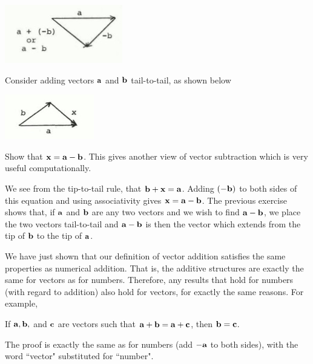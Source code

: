 \documentclass[12pt,letterpaper,reqno]{article}
\numberwithin{equation}{section}
\begin{document}
\begin{center}
	\includegraphics[scale=0.5]{figures_mvc/a_minus_b}
\end{center}

\begin{exercise}
Consider adding vectors ${\bf a}$ and ${\bf b}$ tail-to-tail, as shown below
	\begin{center}
		\includegraphics[scale=0.5]{figures_mvc/b_plus_x_equals_a}
	\end{center}
	Show that ${\bf x}={\bf a}-{\bf b}$. This gives another view of vector subtraction which is very useful computationally.
\end{exercise}

{\color{red} 
We see from the tip-to-tail rule, that ${\bf b}+{\bf x}={\bf a}$. Adding $(-{\bf b})$ to both sides of this equation and using associativity gives ${\bf x}={\bf a}-{\bf b}$.}
The previous exercise shows that, if ${\bf a}$ and ${\bf b}$ are any two vectors and we wish to find ${\bf a}-{\bf b}$, we place the two vectors tail-to-tail and ${\bf a}-{\bf b}$ is then the vector which extends from the tip of ${\bf b}$ to the tip of ${\bf a}$.

We have just shown that our definition of vector addition satisfies the same properties as numerical addition. That is, the additive structures are exactly the same for vectors as for numbers. Therefore, any results that hold for numbers (with regard to addition) also hold for vectors, for exactly the same reasons. For example,

\begin{thm}
	If ${\bf a}, {\bf b},$ and ${\bf c}$ are vectors such that ${\bf a}+{\bf b}={\bf a}+{\bf c}$, then ${\bf b}={\bf c}$. 
\end{thm}

\begin{pf}
The proof is exactly the same as for numbers (add $-{\bf a}$ to both sides), with the word ``vector" substituted for ``number".
\end{pf}
\end{document}
